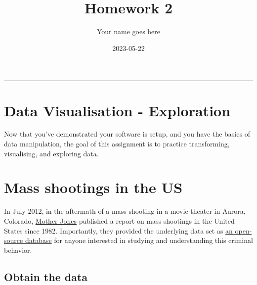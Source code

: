 \documentclass[
]{article}
\title{Homework 2}
\author{Your name goes here}
\date{2023-05-22}
\begin{document}
\maketitle

{
\setcounter{tocdepth}{2}
\tableofcontents
}
\begin{center}\rule{0.5\linewidth}{0.5pt}\end{center}

\hypertarget{data-visualisation---exploration}{%
\section{Data Visualisation -
Exploration}\label{data-visualisation---exploration}}

Now that you've demonstrated your software is setup, and you have the
basics of data manipulation, the goal of this assignment is to practice
transforming, visualising, and exploring data.

\hypertarget{mass-shootings-in-the-us}{%
\section{Mass shootings in the US}\label{mass-shootings-in-the-us}}

In July 2012, in the aftermath of a mass shooting in a movie theater in
Aurora, Colorado,
\href{https://www.motherjones.com/politics/2012/07/mass-shootings-map/}{Mother
Jones} published a report on mass shootings in the United States since
1982. Importantly, they provided the underlying data set as
\href{https://www.motherjones.com/politics/2012/12/mass-shootings-mother-jones-full-data/}{an
open-source database} for anyone interested in studying and
understanding this criminal behavior.

\hypertarget{obtain-the-data}{%
\subsection{Obtain the data}\label{obtain-the-data}}
\end{document}
